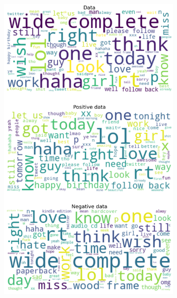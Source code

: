 \documentclass{article}
\begin{document}
\begin{itemize}
\begin{figure}[H]
\begin{subfigure}[b]{0.24\textwidth}
      \includegraphics[width=\textwidth]{chapter-06/section-01-01/10/visualization/3/wordcloud.png}
    \end{subfigure}
    \begin{subfigure}[b]{0.24\textwidth}
      \centering

\end{subfigure}
\end{figure}
\end{itemize}
\end{document}
